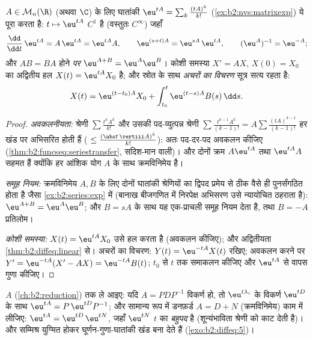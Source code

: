 \begin{theorem}\label{thm:b2:diffeq:matrixexp}
$A \in \mathcal{M}_n(\R)$ (अथवा $\C$) के लिए घातांकी $\eu^{tA}
= \sum_k \frac{(tA)^k}{k!}$ (\cref{ex:b2:nvs:matrixexp}) ये पूरा करता है: $t \mapsto \eu^{tA}$ $C^1$ है
(वस्तुतः $C^\infty$) जहाँ
\[
\frac{\dd}{\dd t}\,\eu^{tA} = A\,\eu^{tA} = \eu^{tA}A ,
\qquad
\eu^{(s+t)A} = \eu^{sA}\,\eu^{tA},
\qquad
(\eu^{A})^{-1} = \eu^{-A} ;
\]
और $AB = BA$ होने \emph{पर} $\eu^{A + B} = \eu^A\eu^B$। कोशी समस्या $X' = AX$, $X(0) = X_0$ का अद्वितीय हल $X(t) =
\eu^{tA}X_0$ है;
और स्रोत के साथ \emph{अचरों का विचरण} सूत्र सत्य रहता है:
\[
X(t) = \eu^{(t - t_0)A}X_0 + \int_{t_0}^{t} \eu^{(t-s)A}B(s)\,\dd
s .
\]
\end{theorem}

\begin{proof}
\emph{अवकलनीयता:} श्रेणी $\sum \frac{t^kA^k}{k!}$ और उसकी पद-व्युत्पन्न श्रेणी $\sum \frac{t^{k-1}A^k}{(k-1)!} = A\sum
\frac{(tA)^{k-1}}{(k-1)!}$ हर खंड पर
 अभिसरित होती हैं ( $\leq \frac{(\abs t\,\vertiii A)^k}{k!}$): अतः पद-दर-पद अवकलन कीजिए
(\cref{thm:b2:funcseq:seriestransfer}, सदिश-मान वाली)। और दोनों क्रम $A\eu^{tA}$ तथा $\eu^{tA}A$ सहमत हैं क्योंकि हर आंशिक
योग $A$ के साथ क्रमविनिमेय है।

\emph{समूह नियम:} क्रमविनिमेय $A, B$ के लिए दोनों घातांकी श्रेणियों का  द्विपद प्रमेय से ठीक वैसे ही पुनर्संगठित होता है जैसा \cref{ex:b2:series:exp} में
(बानाख बीजगणित में निरपेक्ष अभिसरण उसे न्यायोचित ठहराता है): $\eu^{A+B} = \eu^A\eu^B$; और $B = sA$
के साथ यह एक-प्राचली समूह नियम देता है, तथा $B = -A$ प्रतिलोम।

\emph{कोशी समस्या:} $X(t) = \eu^{tA}X_0$ उसे हल करता है (अवकलन कीजिए); और अद्वितीयता \cref{thm:b2:diffeq:linear}
से। अचरों का विचरण: $Y(t) = \eu^{-tA}X(t)$ रखिए; अवकलन करने पर $Y' = \eu^{-tA}(X' -
AX) = \eu^{-tA}B(t)$; $t_0$ से $t$ तक समाकलन
कीजिए और $\eu^{tA}$ से वापस गुणा कीजिए।
\end{proof}

\begin{method}[$\eu^{tA}$ का परिकलन]\label{met:b2:diffeq:computeexp}
$A$ (\cref{ch:b2:reduction}) तक ले आइए: यदि $A = PDP^{-1}$ विकर्ण हो, तो $\eu^{t\lambda_i}$ के विकर्ण $\eu^{tD}$ के साथ $\eu^{tA} = P\,\eu^{tD}P^{-1}$;
और सामान्य रूप में डनफ़र्ड $A = D + N$ (क्रमविनिमेय) काम में लीजिए: $\eu^{tA} = \eu^{tD}\,\eu^{tN}$, जहाँ $\eu^{tN}$
$t$ का \emph{बहुपद} है (शून्यंभाविता श्रेणी को काट देती है)। और सम्मिश्र
 युग्मित होकर घूर्णन-गुणा-घातांकी खंड बना देते हैं (\cref{exo:b2:diffeq:5})।
\end{method}


